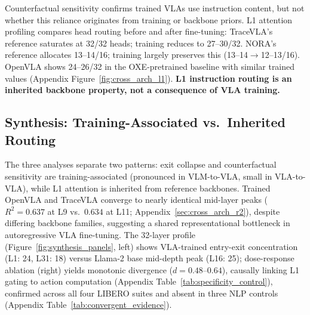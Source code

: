 Counterfactual sensitivity confirms trained VLAs use instruction content, but not whether this reliance originates from training or backbone priors.
L1 attention profiling compares head routing before and after fine-tuning: TraceVLA's reference saturates at 32/32 heads; training reduces to 27--30/32.
NORA's reference allocates 13--14/16; training largely preserves this (13--14$\to$12--13/16).
OpenVLA shows 24--26/32 in the OXE-pretrained baseline with similar trained values (Appendix Figure~\ref{fig:cross_arch_l1}).
\textbf{L1 instruction routing is an inherited backbone property, not a consequence of VLA training.}


\subsection{Synthesis: Training-Associated vs.\ Inherited Routing}
\label{sec:routing_synthesis}

The three analyses separate two patterns: exit collapse and counterfactual sensitivity are training-associated (pronounced in VLM-to-VLA, small in VLA-to-VLA), while L1 attention is inherited from reference backbones.
Trained OpenVLA and TraceVLA converge to nearly identical mid-layer peaks ($R^2 = 0.637$ at L9 vs.\ $0.634$ at L11; Appendix~\ref{sec:cross_arch_r2}), despite differing backbone families, suggesting a shared representational bottleneck in autoregressive VLA fine-tuning.
The 32-layer profile (Figure~\ref{fig:synthesis_panels}, left) shows VLA-trained entry-exit concentration (L1: 24, L31: 18) versus Llama-2 base mid-depth peak (L16: 25); dose-response ablation (right) yields monotonic divergence ($d = 0.48$--$0.64$), causally linking L1 gating to action computation (Appendix Table~\ref{tab:specificity_control}), confirmed across all four LIBERO suites and absent in three NLP controls (Appendix Table~\ref{tab:convergent_evidence}).

